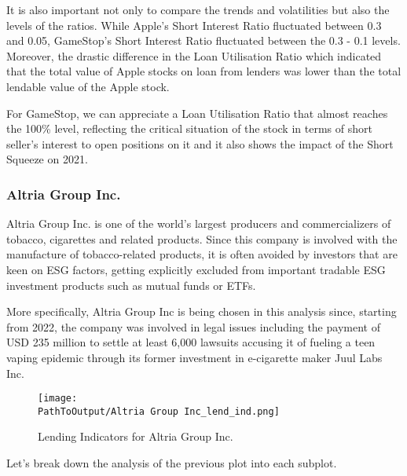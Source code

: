 It is also important not only to compare the trends and volatilities but also the levels of the ratios. While Apple's Short Interest Ratio fluctuated between 0.3 and 0.05, GameStop's Short Interest Ratio fluctuated between the 0.3 - 0.1 levels. Moreover, the drastic difference in the Loan Utilisation Ratio which indicated that the total value of Apple stocks on loan from lenders was lower than the total lendable value of the Apple stock.

For GameStop, we can appreciate a Loan Utilisation Ratio that almost reaches the 100\% level, reflecting the critical situation of the stock in terms of short seller's interest to open positions on it and it also shows the impact of the Short Squeeze on 2021.


\subsubsection{Altria Group Inc.}

Altria Group Inc. is one of the world's largest producers and commercializers of tobacco, cigarettes and related products. Since this company is involved with the manufacture of tobacco-related products, it is often avoided by investors that are keen on ESG factors, getting explicitly excluded from important tradable ESG investment products such as mutual funds or ETFs.

More specifically, Altria Group Inc is being chosen in this analysis since, starting from 2022, the company was involved in legal issues including the payment of USD 235 million to settle at least 6,000 lawsuits accusing it of fueling a teen vaping epidemic through its former investment in e-cigarette maker Juul Labs Inc.

\begin{figure}[H]
	\centering
	\caption{Lending Indicators for Altria Group Inc.}
	  \centering
	  \texttt{[image: \\PathToOutput/Altria Group Inc\_lend\_ind.png]}
	\label{fig:altria_lending_indicators}
\end{figure}

Let's break down the analysis of the previous plot into each subplot.


